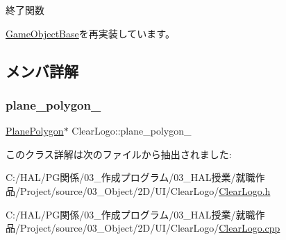 終了関数 



\mbox{\hyperlink{class_game_object_base_a97e1bc277d7b1c0156d4735de29a022c}{Game\+Object\+Base}}を再実装しています。



\subsection{メンバ詳解}
\mbox{\label{class_clear_logo_ad4c1abbd7e501cc44357c9f65e12482f}} 
\subsubsection{\texorpdfstring{plane\+\_\+polygon\+\_\+}{plane\_polygon\_}}
{\footnotesize\ttfamily \mbox{\hyperlink{class_plane_polygon}{Plane\+Polygon}}$\ast$ Clear\+Logo\+::plane\+\_\+polygon\+\_\+}



このクラス詳解は次のファイルから抽出されました\+:\begin{DoxyCompactItemize}
\item 
C\+:/\+H\+A\+L/\+P\+G関係/03\+\_\+作成プログラム/03\+\_\+\+H\+A\+L授業/就職作品/\+Project/source/03\+\_\+\+Object/2\+D/\+U\+I/\+Clear\+Logo/\mbox{\hyperlink{_clear_logo_8h}{Clear\+Logo.\+h}}\item 
C\+:/\+H\+A\+L/\+P\+G関係/03\+\_\+作成プログラム/03\+\_\+\+H\+A\+L授業/就職作品/\+Project/source/03\+\_\+\+Object/2\+D/\+U\+I/\+Clear\+Logo/\mbox{\hyperlink{_clear_logo_8cpp}{Clear\+Logo.\+cpp}}\end{DoxyCompactItemize}
